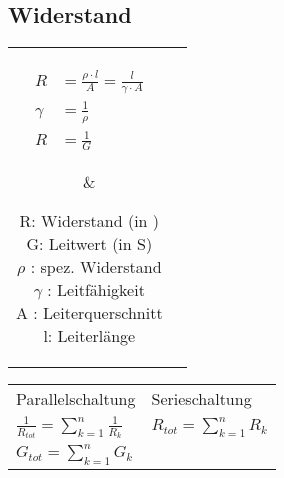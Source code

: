 \begin{sectionbox}
	\subsection{Widerstand}

	\begin{tabular}{cc}
	\parbox{2.5cm}{
		\begin{emphbox}
			\begin{align*}
				R &= \frac{\rho \cdot l}{A} = \frac{l}{\gamma \cdot A} \\
				\gamma &= \frac{1}{\rho} \\
				R &= \frac{1}{G}
			\end{align*}
		\end{emphbox}
	} & 

	\parbox{3cm}{
		\begin{symbolbox}
			R: Widerstand (in \ohm) \\
			G: Leitwert (in S) \\
			$\rho$ : spez. Widerstand \\
			$\gamma$ : Leitfähigkeit \\
			A : Leiterquerschnitt \\
			l: Leiterlänge
		\end{symbolbox}
	}
	\end{tabular}

	\begin{emphbox}
	
		\begin{tabular}{l|l}
			Parallelschaltung & Serieschaltung \\
			$ \frac{1}{R_{tot}} = \sum\limits _{k=1}^{n}\frac{1}{R_k} $	&
			$ R_{tot} = \sum\limits _{k=1}^{n}R_k $ \\
			$ G_{tot} = \sum\limits _{k=1}^{n}G_k $ & \\
		\end{tabular}
	\end{emphbox}
	
\end{sectionbox}


